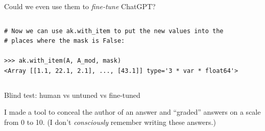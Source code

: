 \documentclass[aspectratio=169]{beamer}
\begin{document}
\begin{frame}[fragile]{Could we even use them to {\it fine-tune} ChatGPT?}
\begin{columns}
\begin{uncoverenv}
\begin{verbatim}
# Now we can use ak.with_item to put the new values into the
# places where the mask is False:

>>> ak.with_item(A, A_mod, mask)
<Array [[1.1, 22.1, 2.1], ..., [43.1]] type='3 * var * float64'>
\end{verbatim}
\end{uncoverenv}
\end{columns}
\end{frame}

\begin{frame}{Blind test: human vs untuned vs fine-tuned}
\large
\vspace{0.5 cm}

I made a tool to conceal the author of an answer and ``graded'' answers on a scale from 0 to 10. (I don't {\it consciously} remember writing these answers.)

\vspace{0.35 cm}
\begin{center}
\end{center}

\vspace{0.25 cm}
\end{frame}
\end{document}
